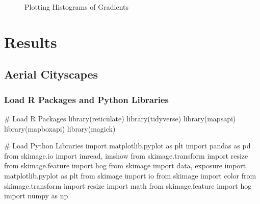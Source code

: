 \documentclass[
  letterpaper,
  DIV=11,
  numbers=noendperiod]{scrreprt}
\newenvironment{Shaded}{\begin{snugshade}}{\end{snugshade}}
\newcommand{\CommentTok}[1]{\textcolor[rgb]{0.37,0.37,0.37}{#1}}
\newcommand{\FunctionTok}[1]{\textcolor[rgb]{0.28,0.35,0.67}{#1}}
\newcommand{\ImportTok}[1]{\textcolor[rgb]{0.00,0.46,0.62}{#1}}
\newcommand{\NormalTok}[1]{\textcolor[rgb]{0.00,0.23,0.31}{#1}}
\begin{document}
\begin{figure}
\begin{minipage}{0.25\linewidth}
\begin{figure}[H]
{}


\end{figure}%

\end{minipage}%

\caption{\label{fig-histograms-plot-diag-line}Plotting Histograms of
Gradients}

\end{figure}%

\part{Results}

\chapter{Aerial Cityscapes}\label{aerial-cityscapes}

\section{Load R Packages and Python
Libraries}\label{load-r-packages-and-python-libraries}

\begin{Shaded}
\begin{Highlighting}[]
\CommentTok{\# Load R Packages}
\FunctionTok{library}\NormalTok{(reticulate)}
\FunctionTok{library}\NormalTok{(tidyverse)}
\FunctionTok{library}\NormalTok{(mapsapi)}
\FunctionTok{library}\NormalTok{(mapboxapi)}
\FunctionTok{library}\NormalTok{(magick)}
\end{Highlighting}
\end{Shaded}

\begin{Shaded}
\begin{Highlighting}[]
\CommentTok{\# Load Python Libraries}
\ImportTok{import}\NormalTok{ matplotlib.pyplot }\ImportTok{as}\NormalTok{ plt}
\ImportTok{import}\NormalTok{ pandas }\ImportTok{as}\NormalTok{ pd}
\ImportTok{from}\NormalTok{ skimage.io }\ImportTok{import}\NormalTok{ imread, imshow}
\ImportTok{from}\NormalTok{ skimage.transform }\ImportTok{import}\NormalTok{ resize}
\ImportTok{from}\NormalTok{ skimage.feature }\ImportTok{import}\NormalTok{ hog}
\ImportTok{from}\NormalTok{ skimage }\ImportTok{import}\NormalTok{ data, exposure}
\ImportTok{import}\NormalTok{ matplotlib.pyplot }\ImportTok{as}\NormalTok{ plt}
\ImportTok{from}\NormalTok{ skimage }\ImportTok{import}\NormalTok{ io}
\ImportTok{from}\NormalTok{ skimage }\ImportTok{import}\NormalTok{ color}
\ImportTok{from}\NormalTok{ skimage.transform }\ImportTok{import}\NormalTok{ resize}
\ImportTok{import}\NormalTok{ math}
\ImportTok{from}\NormalTok{ skimage.feature }\ImportTok{import}\NormalTok{ hog}
\ImportTok{import}\NormalTok{ numpy }\ImportTok{as}\NormalTok{ np}
\end{Highlighting}
\end{Shaded}
\end{document}
